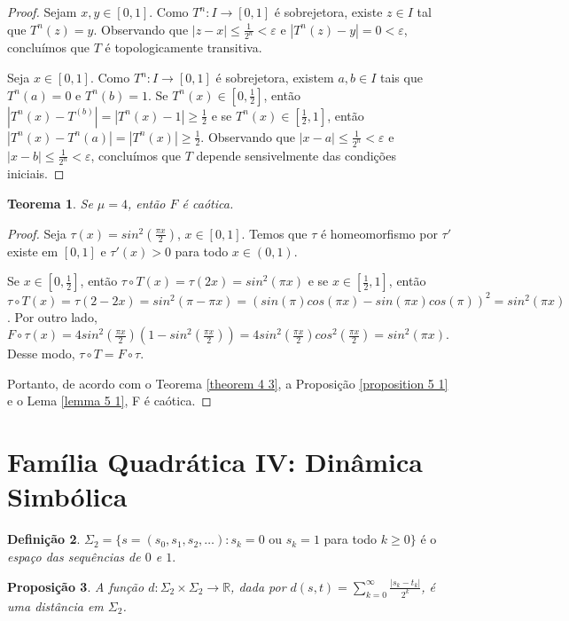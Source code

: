 \documentclass[a4paper, 12pt]{article}
\theoremstyle{definition}
\newtheorem{definition}{Definição}[section]
\theoremstyle{plain}
\newtheorem{proposition}[definition]{Proposição}
\theoremstyle{plain}
\theoremstyle{plain}
\newtheorem{theorem}[definition]{Teorema}
\theoremstyle{remark}
\newcommand{\RR}{\mathbb{R}}
\begin{document}
\begin{proof}
Sejam $x, y \in [0,1]$. Como $T^n: I \rightarrow [0,1]$ é sobrejetora, existe $z \in I$ tal que $T^n(z) = y$. Observando que $|z - x| \leq \frac{1}{2^n} < \varepsilon$ e $|T^n(z) - y| = 0 < \varepsilon$, concluímos que $T$ é topologicamente transitiva.

Seja $x \in [0,1]$.  Como $T^n: I \rightarrow [0,1]$ é sobrejetora, existem $a, b \in I$ tais que $T^n(a) = 0$ e $T^n(b) = 1$. Se $T^n(x) \in [0, \frac{1}{2}]$, então $|T^n(x) - T^(b)| = |T^n(x) - 1| \geq \frac{1}{2}$ e se $T^n(x) \in [\frac{1}{2}, 1]$, então $|T^n(x) - T^n(a)| = |T^n(x)| \geq \frac{1}{2}$. Observando que $|x - a| \leq \frac{1}{2^n} < \varepsilon$ e $|x - b| \leq \frac{1}{2^n} < \varepsilon$, concluímos que $T$ depende sensivelmente das condições iniciais.
\end{proof}

\begin{theorem}
Se $\mu = 4$, então $F$ é caótica.
\end{theorem}

\begin{proof}
Seja $\tau(x) = sin^2(\frac{\pi x}{2})$, $x \in [0,1]$. Temos que $\tau$ é homeomorfismo por $\tau'$ existe em $[0,1]$ e $\tau'(x) > 0$ para todo $x \in (0,1)$.

Se $x \in [0, \frac{1}{2}]$, então $\tau \circ T(x) = \tau(2x) = sin^2(\pi x)$ e se $x \in [\frac{1}{2}, 1]$, então $\tau \circ T(x) = \tau(2 - 2x) = sin^2(\pi- \pi x) = (sin(\pi)cos(\pi x) - sin(\pi x)cos(\pi))^2 = sin^2(\pi x)$. Por outro lado, $F \circ \tau(x) = 4 sin^2(\frac{\pi x}{2})(1 - sin^2(\frac{\pi x}{2})) = 4sin^2(\frac{\pi x}{2})cos^2(\frac{\pi x}{2}) = sin^2(\pi x)$. Desse modo, $\tau \circ T = F \circ \tau$.

Portanto, de acordo com o Teorema \ref{theorem 4 3}, a Proposição \ref{proposition 5 1} e o Lema \ref{lemma 5 1}, F é caótica.
\end{proof}

\section{Família Quadrática IV: Dinâmica Simbólica}

\begin{definition}
$\Sigma_2 = \{s = (s_0,s_1,s_2,\dots) : s_k = 0$ ou $s_k = 1$ para todo $k\geq 0\}$ é o \textit{espaço das sequências de $0$ e $1$}.
\end{definition}

\begin{proposition}
A função $d: \Sigma_2 \times \Sigma_2 \rightarrow \RR$, dada por $d(s, t) = \sum_{k=0}^{\infty} \frac{|s_k - t_k|}{2^k}$, é uma distância em $\Sigma_2$.
\end{proposition}
\end{document}

